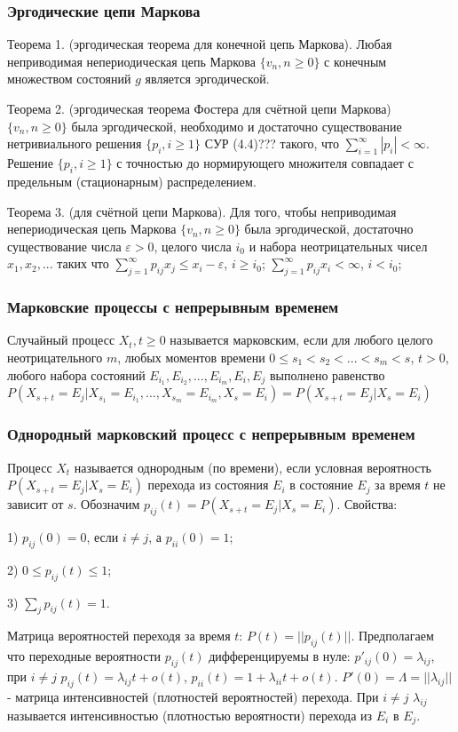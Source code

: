 \subsubsection*{Эргодические цепи Маркова}

Теорема 1. (эргодическая теорема для конечной цепь Маркова). Любая неприводимая непериодическая цепь Маркова $\{v_n, n\geq 0 \}$ с конечным множеством состояний $g$ является эргодической.

Теорема 2. (эргодическая теорема Фостера для счётной цепи Маркова) $\{v_n, n \geq 0 \}$ была эргодической, необходимо и достаточно существование нетривиального решения $\{p_i, i \geq 1 \}$ СУР (4.4)??? такого, что $\sum_{i=1}^\infty |p_i|<\infty$.
Решение $\{p_i, i \geq 1 \}$ с точностью до нормирующего множителя совпадает с предельным (стационарным) распределением.

Теорема 3. (для счётной цепи Маркова). Для того, чтобы  неприводимая непериодическая цепь Маркова $\{v_n, n\geq 0 \}$ была эргодической, достаточно существование числа $\varepsilon > 0$, целого числа $i_0$ и набора неотрицательных чисел $x_1,x_2,...$ таких что
$\sum_{j=1}^\infty p_{ij} x_j \leq x_i - \varepsilon$, $i \geq i_0$;
$\sum_{j=1}^\infty p_{ij} x_i < \infty$, $i < i_0$;

\subsubsection*{Марковские процессы с непрерывным временем}

Случайный процесс $X_t, t \geq 0$ называется марковским, если для любого целого неотрицательного $m$, любых моментов времени $0\leq s_1<s_2<...<s_m<s$, $t>0$, любого набора состояний $E_{i_1}, E_{i_2},...,E_{i_m},E_i, E_j$ выполнено равенство $P(X_{s+t}=E_j | X_{s_1}=E_{i_1}, ..., X_{s_m}=E_{i_m}, X_s=E_i)= P(X_{s+t}=E_j | X_s=E_i)$

\subsubsection*{Однородный марковский процесс с непрерывным временем}

Процесс $X_t$ называется однородным (по времени), если условная вероятность $P(X_{s+t}=E_j|X_s=E_i)$ перехода из состояния $E_i$ в состояние $E_j$ за время $t$ не зависит от $s$.
Обозначим $p_{ij}(t)=P(X_{s+t}=E_j | X_s=E_i)$.
Свойства:

1) $p_{ij}(0)=0$, если $i\ne j$, а $p_{ii}(0)=1$;

2) $0\leq p_{ij}(t)\leq 1$;

3) $\sum _j p_{ij}(t)=1$.

Матрица вероятностей переходя за время $t$: $P(t)=||p_{ij}(t)||$.
Предполагаем что переходные вероятности $p_{ij}(t)$ дифференцируемы в нуле: $p'_{ij}(0)=\lambda_{ij}$, при $i\ne j$ $p_{ij}(t)=\lambda_{ij}t+o(t)$, $p_{ii}(t)=1+\lambda_{ii}t+o(t)$.
$P'(0)=\Lambda=||\lambda_{ij}||$ - матрица интенсивностей (плотностей вероятностей) перехода.
При $i\ne j$ $\lambda_{ij}$ называется интенсивностью (плотностью вероятности) перехода из $E_i$ в $E_j$.